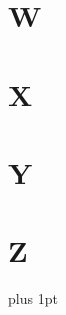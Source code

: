 \documentclass[]{memoir}
\begin{document}
\begin{multicols}{2}
\section*{W}


\section*{X}


\section*{Y}


\section*{Z}


\end{multicols}
\parskip=0pt plus 1pt
\restoregeometry
\pagebreak


\cleardoublepage
{}
\setlength{\columnsep}{0.75cm}
\printindex

\end{document}

